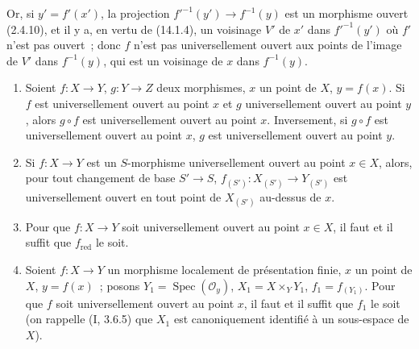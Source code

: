 
Or, si $y'=f'(x')$, la projection $f'^{-1}(y')\to f^{-1}(y)$ est un morphisme
ouvert (2.4.10), et il y a, en vertu de (14.1.4), un voisinage $V'$ de $x'$ dans
$f'^{-1}(y')$ où $f'$ n'est pas ouvert~; donc $f$ n'est pas universellement ouvert
aux points de l'image de $V'$ dans $f^{-1}(y)$, qui est un voisinage de $x$ dans
$f^{-1}(y)$.

\begin{proposition}[14.3.4]
\label{IV.14.3.4-fr}
\begin{enumerate}[label=(\roman*)]
  \item Soient $f:X\to Y$, $g:Y\to Z$ deux morphismes, $x$ un point de $X$,
  $y=f(x)$. Si $f$ est universellement ouvert au point $x$ et $g$ universellement
  ouvert au point $y$, alors $g\circ f$ est universellement ouvert au point $x$.
  Inversement, si $g\circ f$ est universellement ouvert au point $x$, $g$ est
  universellement ouvert au point $y$.

  \item Si $f:X\to Y$ est un $S$-morphisme universellement ouvert au point
  $x\in X$, alors, pour tout changement de base $S'\to S$,
  $f_{(S')}:X_{(S')}\to Y_{(S')}$ est universellement ouvert en tout point de
  $X_{(S')}$ au-dessus de $x$.

  \item Pour que $f:X\to Y$ soit universellement ouvert au point $x\in X$, il
  faut et il suffit que $f_{\mathrm{red}}$ le soit.

  \item Soient $f:X\to Y$ un morphisme localement de présentation finie, $x$ un
  point de $X$, $y=f(x)$~; posons $Y_1=\operatorname{Spec}(\mathcal O_y)$,
  $X_1=X\times_Y Y_1$, $f_1=f_{(Y_1)}$. Pour que $f$ soit universellement ouvert
  au point $x$, il faut et il suffit que $f_1$ le soit (on rappelle (I, 3.6.5) que
  $X_1$ est canoniquement identifié à un sous-espace de $X$).
\end{enumerate}
\end{proposition}

